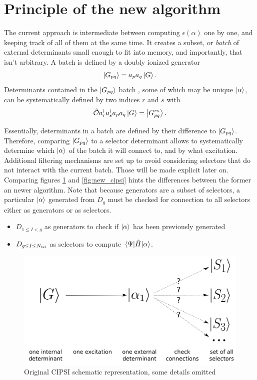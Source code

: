 \documentclass[./thesis.tex]{subfiles}
\begin{document}
\section{Principle of the new algorithm}

The current approach is intermediate between computing $\epsilon(\alpha)$ one by one, and keeping track of all of them at the same time.
It creates a subset, or \emph{batch} of external determinants small enough to fit into memory, and importantly, that isn't arbitrary.
A batch is defined by a doubly ionized generator
\begin{equation}
\ket {G_{pq}} = a_p a_q \ket G.
\end{equation}
Determinants contained in the $\ket {G_{pq}}$ batch , some of which may be unique ${\ket{\alpha}}$, can be systematically defined by two indices $r$ and $s$ with
\begin{equation}
{\hat{\mathcal{O}}} a^\dagger_r a^\dagger_s a_p a_q  \ket G = \ket{G^{rs}_{pq}}.
\end{equation}

Essentially, determinants in a batch are defined by their difference to $\ket{G_{pq}}$. Therefore, comparing $\ket{G_{pq}}$ to a selector determinant allows to systematically determine which ${\ket{\alpha}}$ of the batch it will connect to, and by what excitation. Additional filtering mechanisms are set up to avoid considering selectors that do not interact with the current batch. Those will be made explicit later on. Comparing figures \ref{fig:old_cipsi} and \ref{fig:new_cipsi} hints the differences between the former an newer algorithm. Note that because generators are a subset of selectors, a particular ${\ket{\alpha}}$ generated from $D_g$ must be checked for connection to all selectors either as generators or as selectors.

\begin{itemize}
\item
$D_{1 \le I < g}$ as generators to check if ${\ket{\alpha}}$ has been previously generated
\item
$D_{g \le I \le {N_\text{sel}}}$ as selectors to compute $\mel{\Psi}{\hat{H}}{\alpha}$.
\end{itemize}


\begin{figure}[h!]
        \begin{center}
                \includegraphics[width=0.6\columnwidth]{figures/cipsi/old_cipsi}
        \end{center}
        \caption{Original CIPSI schematic representation, some details omitted}
        \label{fig:old_cipsi}
\end{figure}
\end{document}
